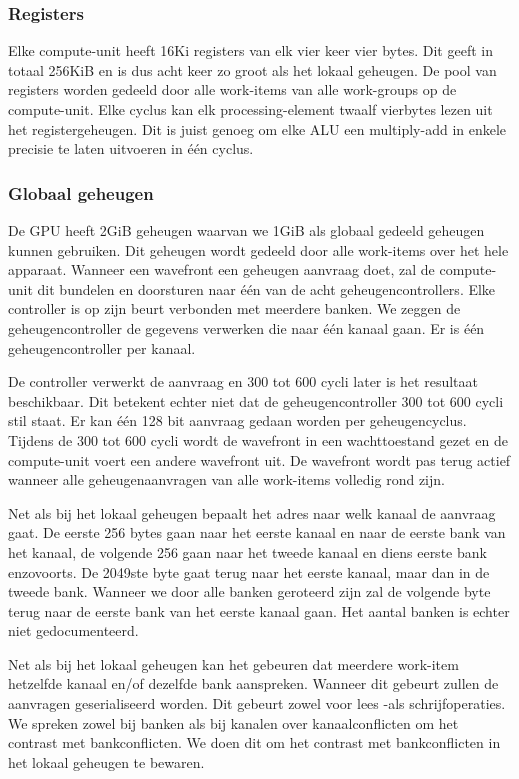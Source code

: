 \subsubsection{Registers}
Elke compute-unit heeft 16Ki registers van elk vier keer vier bytes. Dit geeft in totaal 256KiB en is dus acht keer zo groot als het lokaal geheugen. De pool van registers worden gedeeld door alle work-items van alle work-groups op de compute-unit.   Elke cyclus kan elk processing-element twaalf vierbytes lezen uit het registergeheugen. Dit is juist genoeg om elke ALU een multiply-add in enkele precisie te laten uitvoeren in \'e\'en cyclus.

\subsubsection{Globaal geheugen}
De GPU heeft 2GiB geheugen waarvan we 1GiB als globaal gedeeld geheugen kunnen gebruiken. Dit geheugen wordt gedeeld door alle work-items over het hele apparaat. Wanneer een wavefront een geheugen aanvraag doet, zal de compute-unit dit bundelen en doorsturen naar \'e\'en van de acht geheugencontrollers. Elke controller is op zijn beurt verbonden met meerdere banken. We zeggen de geheugencontroller de gegevens verwerken die naar \'e\'en kanaal gaan. Er is \'e\'en geheugencontroller per kanaal.

De controller verwerkt de aanvraag en 300 tot 600 cycli later is het resultaat beschikbaar. Dit betekent echter niet dat de geheugencontroller 300 tot 600 cycli stil staat. Er kan \'e\'en 128 bit aanvraag gedaan worden per geheugencyclus. Tijdens de 300 tot 600 cycli wordt de wavefront in een wachttoestand gezet en de compute-unit voert een andere wavefront uit. De wavefront wordt pas terug actief wanneer alle geheugenaanvragen van alle work-items volledig rond zijn.

Net als bij het lokaal geheugen bepaalt het adres naar welk kanaal de aanvraag gaat. De eerste 256 bytes gaan naar het eerste kanaal en naar de eerste bank van het kanaal, de volgende 256 gaan naar het tweede kanaal en diens eerste bank enzovoorts. De 2049ste byte gaat terug naar het eerste kanaal, maar dan in de tweede bank. Wanneer we door alle banken geroteerd zijn zal de volgende byte terug naar de eerste bank van het eerste kanaal gaan. Het aantal banken is echter niet gedocumenteerd.

Net als bij het lokaal geheugen kan het gebeuren dat meerdere work-item hetzelfde kanaal en/of dezelfde bank aanspreken. Wanneer dit gebeurt zullen de aanvragen geserialiseerd worden. Dit gebeurt zowel voor lees -als schrijfoperaties. We spreken zowel bij banken als bij kanalen over kanaalconflicten om het contrast met bankconflicten. We doen dit om het contrast met bankconflicten in het lokaal geheugen te bewaren.



